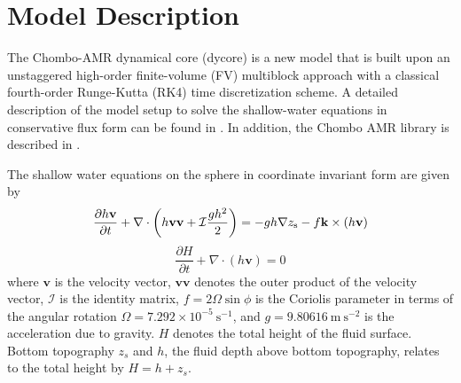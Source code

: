 \section{Model Description}
\label{sec:model}

The Chombo-AMR dynamical core (dycore) is a new model that is built upon
an unstaggered high-order finite-volume (FV) multiblock approach with a
classical fourth-order Runge-Kutta (RK4) time discretization scheme. 
A detailed description of the model
setup to solve the shallow-water 
equations in conservative flux form can be found in
\cite{mccorquodale2015adaptive}.  In addition, the Chombo AMR library is
described in
\cite{Adams:2015gd}.  

The shallow water equations on the sphere in coordinate invariant form
are given by
\begin{equation}
   \label{eq:swmom} \frac{\partial h \mathbf{v}}{\partial t} +
     \nabla \cdot \left( h \mathbf{v} \mathbf{v} + \mathcal{I} \frac{g h^2}{2} \right) =
      - g h \nabla z_{\rm s} - f \mathbf{k} \times (h \mathbf{v})
\end{equation}
\begin{equation}
     \label{eq:swcon}  \frac{\partial H}{\partial t}+ \nabla \cdot (h \mathbf{v}) = 0
\end{equation}
where $\mathbf{v}$ is the velocity vector, $\mathbf{v}\mathbf{v}$ 
denotes the outer product of the velocity vector, 
$\mathcal{I}$ is the identity matrix, $f = 2 \Omega \sin \phi$
is the Coriolis parameter in terms of the angular rotation 
$\Omega = 7.292 \times 10^{-5}\ \mbox{s$^{-1}$}$, and 
$g = 9.80616\ \mbox{m}\ \mbox{s}^{-2}$ is the acceleration due to 
gravity. $H$ denotes the total height of the fluid surface. Bottom topography $z_s$
and $h$, the fluid depth above bottom topography, relates to the total height
by $H = h +z_s$.

